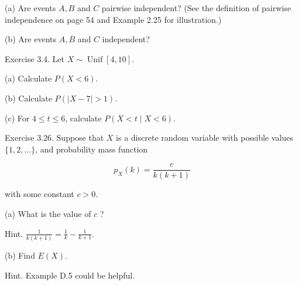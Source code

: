 \documentclass[10pt]{article}
\begin{document}
(a) Are events $A, B$ and $C$ pairwise independent? (See the definition of pairwise independence on page 54 and Example 2.25 for illustration.)

(b) Are events $A, B$ and $C$ independent?


\hfill \break
Exercise 3.4. Let $X \sim \operatorname{Unif}[4,10]$.

(a) Calculate $P(X<6)$.

(b) Calculate $P(|X-7|>1)$.

(c) For $4 \leq t \leq 6$, calculate $P(X<t \mid X<6)$.


\hfill \break
Exercise 3.26. Suppose that $X$ is a discrete random variable with possible values $\{1,2, \ldots\}$, and probability mass function

$$
p_{X}(k)=\frac{c}{k(k+1)}
$$

with some constant $c>0$.

(a) What is the value of $c$ ?

Hint. $\frac{1}{k(k+1)}=\frac{1}{k}-\frac{1}{k+1}$.

(b) Find $E(X)$.

Hint. Example D.5 could be helpful.
\end{document}
